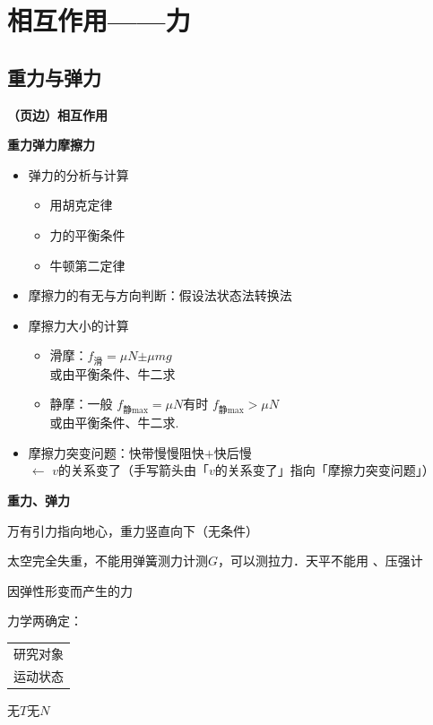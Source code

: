 \chapter{相互作用——力}
\label{ch:02}

\section{重力与弹力}
\textbf{（页边）相互作用}

\textbf{重力\quad 弹力\quad 摩擦力}
\begin{itemize}
\item 弹力的分析与计算
  \begin{itemize}
  \item 用胡克定律
  \item 力的平衡条件
  \item 牛顿第二定律
  \end{itemize}
\item 摩擦力的有无与方向判断：假设法\quad 状态法\quad 转换法
\item 摩擦力大小的计算
  \begin{itemize}
  \item 滑摩：$f_{\text{滑}}=\mu N$\quad $\pm$\quad $\mu mg$ %
    \\ 或由平衡条件、牛二求
  \item 静摩：一般 $f_{\text{静max}}=\mu N$\quad 有时 $f_{\text{静max}}>\mu N$
    \\ 或由平衡条件、牛二求.
  \end{itemize}
\item 摩擦力突变问题：快带慢\quad 慢阻快\quad $+$\quad 快后慢
  \\ $\leftarrow$ $v$的关系变了\quad （手写箭头由「$v$的关系变了」指向「摩擦力突变问题」）
\end{itemize}

\textbf{重力、弹力}\par
万有引力指向地心，重力竖直向下（无条件）\par
太空完全失重，不能用弹簧测力计测$G$，可以测拉力．天平不能用 、压强计\par
{}因弹性形变而产生的力\par
力学两确定：\begin{tabular}[t]{@{}l@{}}研究对象\\运动状态\end{tabular}
无$T$无$N$

